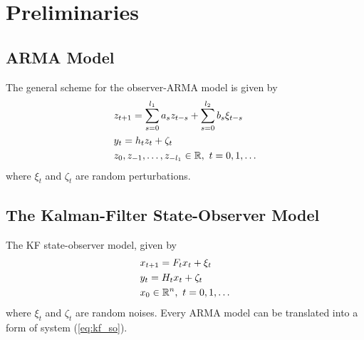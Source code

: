 \section{Preliminaries}\label{sec:pre}
\subsection{ARMA Model}
The general scheme for the observer-ARMA model is given by
\begin{equation}
  \begin{split}
    &z_{t+1}=\sum_{s=0}^{l_1}a_sz_{t-s}+\sum_{s=0}^{l_2}b_s\xi_{t-s}\\
    &y_t=h_tz_t+\zeta_t\\
    &z_0,z_{-1},\ldots,z_{-l_1}\in{\mathbb{R}}, \ t=0,1,\dots
  \end{split}
\end{equation}
where $\xi_t$ and $\zeta_t$ are random perturbations.

\subsection{The Kalman-Filter State-Observer Model}
The KF state-observer model, given by
\begin{equation}\label{eq:kf_so}
  \begin{split}
    &x_{t+1}=F_tx_t + \xi_t\\
    &y_t=H_tx_t+\zeta_t\\
    &x_0\in{\mathbb{R}}^n, \ t=0,1,\dots
  \end{split}
\end{equation}
where $\xi_t$ and $\zeta_t$ are random noises. Every ARMA model can be translated into a form of system (\ref{eq:kf_so}).



